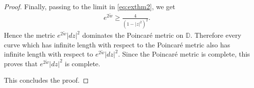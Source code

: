 \documentclass[a4paper,11pt,openright,twoside]{book}
\newcommand{\1}{\mathds{1}}
\theoremstyle{plain}
\theoremstyle{definition}
\theoremstyle{remark}
\begin{document}
\begin{proof}
	Finally, passing to the limit in \eqref{eq:exthm2}, we get
	\begin{align*}
		e^{2\tilde w}\geq \frac{4}{(1-|z|^2)^2}.
	\end{align*}
	Hence the metric $e^{2\tilde w}|dz|^2$ dominates the Poincaré metric on
	$\mathbb{D}$. Therefore every curve which has infinite length with respect to the
	Poincaré metric also has infinite length with respect to $e^{2\tilde w}|dz|^2$.
	Since the Poincaré metric is complete, this proves that $e^{2\tilde w}|dz|^2$ is
	complete.

	This concludes the proof.
\end{proof}




\newpage
\nocite{*}
\printbibliography
\end{document}
